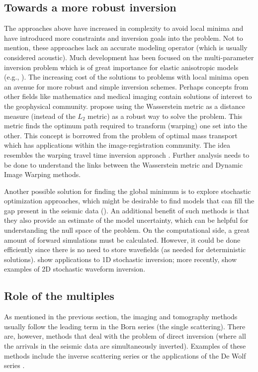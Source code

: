 \subsection{Towards a more robust inversion}

The approaches above have increased in complexity to avoid local minima
 and have introduced more constraints and inversion goals into the problem.  
 Not to mention, these approaches lack an accurate modeling operator
(which is usually considered acoustic). Much development has been focused on the multi-parameter inversion
problem which is of great importance for elastic anisotropic models (e.g., \cite{Kamath}). 
The increasing cost of the solutions to problems with local minima open
an avenue for more robust and simple inversion schemes. Perhaps concepts from 
other fields like mathematics and medical imaging contain solutions of interest 
to the geophysical community. \cite{engquist2013application} propose using the 
Wasserstein metric as a distance measure (instead of the $L_2$ metric) as a robust 
way to solve the problem. This metric finds the optimum path required to
 transform (warping) one set into the other. This concept is borrowed from the problem of optimal mass transport
which has applications within the image-registration community. The idea 
resembles the warping travel time inversion approach \citep{MaWarping,LuoHale}. Further 
analysis needs to be done to understand the links between the Wasserstein metric
and Dynamic Image Warping \citep{hale2013dynamic}  methods.


Another possible solution for finding the global minimum is to explore 
stochastic optimization approaches, which might be 
desirable to find models that can fill the gap present in the seismic data (). An additional benefit
of such methods is that they also provide an estimate of the model uncertainty,
which can be helpful for understanding
the null space of the problem. On the computational side, a great amount of forward simulations
must be calculated. However, it could be done efficiently since 
there is no need to store wavefields (as needed for deterministic 
solutions). \cite{Sen91} show applications to 
1D stochastic inversion; more recently, \citep{stochasticPisa,SenWorkshop} show examples
of 2D stochastic waveform inversion. 

\subsection{Role of the multiples}
As mentioned in the previous section, the imaging and tomography methods usually follow
the leading term in the Born series (the single scattering). There are, however, methods
that deal with the problem of direct inversion (where all the arrivals in the seismic 
data are simultaneously inverted). Examples of these methods include the inverse scattering series \citep{Weglein2003}
or the applications of the De Wolf series \citep{Jakobsen,Ru-ShanWu,WuZheng}.

